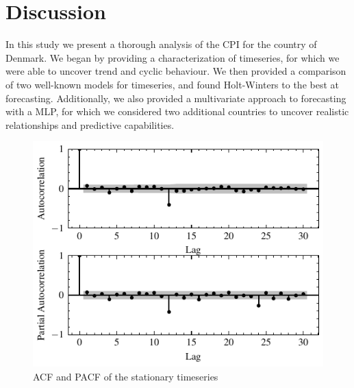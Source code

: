 \documentclass[conference]{IEEEtran}
\begin{document}
\section{Discussion}

In this study we present a thorough analysis of the CPI for the country of Denmark. We began by providing a characterization of timeseries, for which we were able to uncover trend and cyclic behaviour. We then provided a comparison of two well-known models for timeseries, and found Holt-Winters 
to the best at forecasting. Additionally, we also provided a multivariate approach to forecasting with a MLP, for which we considered two additional countries to uncover realistic relationships and predictive capabilities.

%
%

\appendix
\label{appendix:acf_pacf}

\begin{figure}[hbtp]
    \centering
    \includegraphics{../figs/acf_pacf.pdf}
    \caption{ACF and PACF of the stationary timeseries}
    \label{fig:acf_pacf}
\end{figure}
\end{document}
